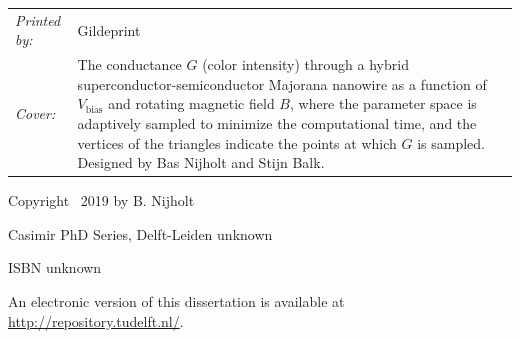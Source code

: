 \begin{titlepage}
\noindent
\begin{tabular}{@{}p{}@{}p{}}
    \textit{Printed by:} & Gildeprint \\[\medskipamount]
    \textit{Cover:} & The conductance $G$ (color intensity) through a hybrid superconductor-semiconductor Majorana nanowire as a function of $V_\textrm{bias}$ and rotating magnetic field $B$, where the parameter space is adaptively sampled to minimize the computational time, and the vertices of the triangles indicate the points at which $G$ is sampled.
    Designed by Bas Nijholt and Stijn Balk.  %
\end{tabular}

\vspace{1\bigskipamount}

\noindent Copyright \textcopyright\ 2019 by B. Nijholt

\medskip
\noindent Casimir PhD Series, Delft-Leiden unknown  %

\medskip
\noindent ISBN unknown

\medskip
\noindent An electronic version of this dissertation is available at \\
\url{http://repository.tudelft.nl/}.

\end{titlepage}
